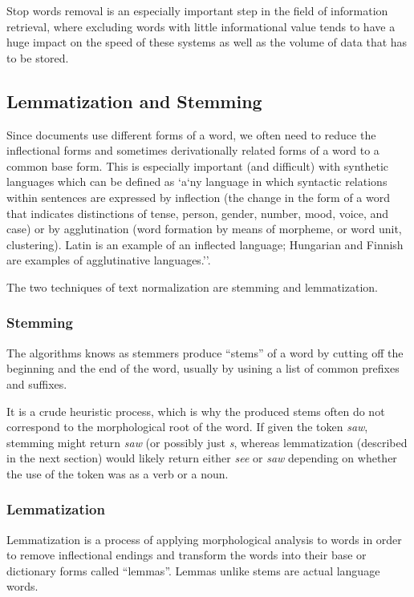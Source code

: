 Stop words removal is an especially important step in the field of information retrieval, where excluding words with little informational value tends to have a huge impact on the speed of these systems as well as the volume of data that has to be stored.

\subsection{Lemmatization and Stemming}
Since documents use different forms of a word, we often need to reduce the inflectional forms and sometimes derivationally related forms of a word to a common base form. This is especially important (and difficult) with synthetic languages which can be defined as `a`ny language in which syntactic relations within sentences are expressed by inflection (the change in the form of a word that indicates distinctions of tense, person, gender, number, mood, voice, and case) or by agglutination (word formation by means of morpheme, or word unit, clustering). Latin is an example of an inflected language; Hungarian and Finnish are examples of agglutinative languages.''\cite{synthetic_lang}.

The two techniques of text normalization are stemming and lemmatization.
\subsubsection{Stemming}
The algorithms knows as stemmers produce ``stems'' of a word by cutting off the beginning and the end of the word, usually by usining a list of common prefixes and suffixes.\cite{stemming_vs_lemmatization}

It is a crude heuristic process, which is why the produced stems often do not correspond to the morphological root of the word.  If given the token \textit{saw}, stemming might return \textit{saw} (or possibly just \textit{s}, whereas lemmatization (described in the next section) would likely return either \textit{see} or \textit{saw} depending on whether the use of the token was as a verb or a noun.\cite{stemming_vs_lemmatization_twd}

\subsubsection{Lemmatization}
Lemmatization is a process of applying morphological analysis to words in order to remove inflectional endings and transform the words into their base or dictionary forms called ``lemmas''. Lemmas unlike stems are actual language words.\cite{stopwords} 

